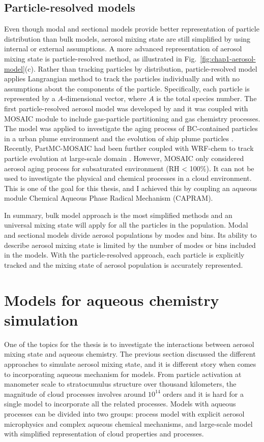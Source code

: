 \documentclass[edeposit,fullpage]{uiucthesis2009}
\begin{document}
\subsection{Particle-resolved models}
Even though modal and sectional models provide better representation of particle distribution than bulk models, aerosol mixing state are still simplified by using internal or external assumptions. A more advanced representation of aerosol mixing state is particle-resolved method, as illustrated in Fig.~\ref{fig:chap1-aerosol-model}(c). Rather than tracking particles by distribution, particle-resolved model applies Langrangian method to track the particles individually and with no assumptions about the components of the particle. Specifically, each particle is represented by a $A$-dimensional vector, where $A$ is the total species number. The first particle-resolved aerosol model was developed by \citet{Riemer2009} and it was coupled with MOSAIC module to include gas-particle partitioning and gas chemistry processes. The model was applied to investigate the aging process of BC-contained particles in a urban plume environment and the evolution of ship plume particles \citep{tian2014modeling, Ching2016}. Recently, PartMC-MOSAIC had been further coupled with WRF-chem to track particle evolution at large-scale domain \citep{curtis2017single}. However, MOSAIC only considered aerosol aging process for subsaturated environment (RH < 100\%). It can not be used to investigate the physical and chemical processes in a cloud environment. This is one of the goal for this thesis, and I achieved this by coupling an aqueous module Chemical Aqueous Phase Radical Mechanism (CAPRAM). 

In summary, bulk model approach is the most simplified methods and an universal mixing state will apply for all the particles in the population. Modal and sectional models divide aerosol populations by modes and bins. Its ability to describe aerosol mixing state is limited by the number of modes or bins included in the models. With the particle-resolved approach, each particle is explicitly tracked and the mixing state of aerosol population is accurately represented.  

\section{Models for aqueous chemistry simulation }
One of the topics for the thesis is to investigate the interactions between aerosol mixing state and aqueous chemistry. The previous section discussed the different approaches to simulate aerosol mixing state, and it is different story when comes to incorporating aqueous mechanism for models. From particle activation at manometer scale to stratocumulus structure over thousand kilometers, the magnitude of cloud processes involves around $10^{14}$ orders and it is hard for a single model to incorporate all the related processes. Models with aqueous processes can be divided into two groups: process model with explicit aerosol microphysics and complex aqueous chemical mechanisms, and large-scale model with simplified representation of cloud properties and processes. 
\end{document}
